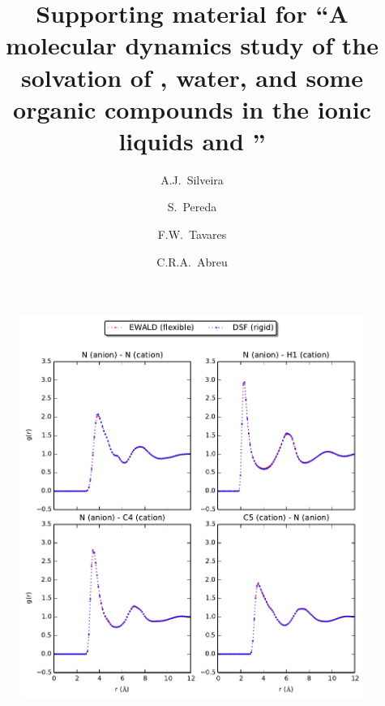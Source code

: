 \documentclass[3p,onecolumn]{elsarticle}
\begin{document}
\begin{frontmatter}

\title{Supporting material for ``A molecular dynamics study of the solvation of , water, and some organic compounds in the ionic liquids \ce{[emim][B(CN)_4]} and \ce{[emim][NTf_2]}''}

\author[rvt]{A.J.~Silveira}
\author[rvt]{S.~Pereda}
\author[focal,els]{F.W.~Tavares}
\author[focal]{C.R.A.~Abreu}

\address[rvt]{Planta Piloto de Ingenier\'ia Qu\'imica, PLAPIQUI, Universidad Nacional del Sur,Camino La Carrindanga Km 7-CC: 717, Bah\'ia Blanca, Argentina}
\address[focal]{Chemical Engineering Department, Escola de Qu\'imica, Universidade Federal do Rio de Janeiro,Rio de Janeiro, RJ 21941-909, Brazil}
\address[els]{COPPE, Universidade Federal do Rio de Janeiro, Rio de Janeiro, RJ 21941-909, Brazil}

\end{frontmatter}

\begin{figure}[ht]
\includegraphics[]{rdf-koller}
\caption{\ce{[emim][B(CN)_4]}}
\label{fig:rdf-koller}
\end{figure}
\end{document}
